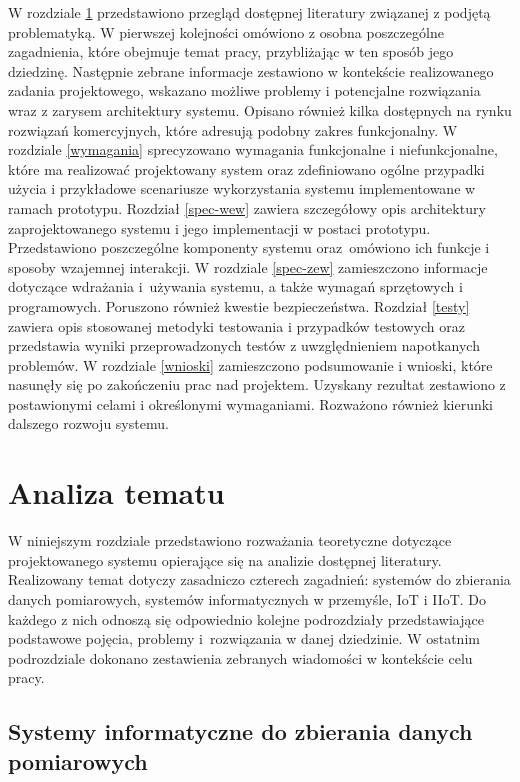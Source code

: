 \documentclass[a4paper, 12pt, twoside]{article}
\begin{document}
W rozdziale \ref{analiza} przedstawiono przegląd dostępnej literatury związanej z podjętą problematyką.
W pierwszej kolejności omówiono z osobna poszczególne zagadnienia, które
obejmuje temat pracy, przybliżając w ten sposób jego dziedzinę.
Następnie zebrane informacje zestawiono w kontekście realizowanego zadania projektowego,
wskazano możliwe problemy i potencjalne rozwiązania wraz z zarysem architektury
systemu. Opisano również kilka dostępnych na rynku rozwiązań komercyjnych,
które adresują podobny zakres funkcjonalny. W rozdziale \ref{wymagania} sprecyzowano
wymagania funkcjonalne i niefunkcjonalne, które ma realizować projektowany system
oraz zdefiniowano ogólne przypadki użycia i przykładowe scenariusze wykorzystania systemu
implementowane w ramach prototypu. Rozdział \ref{spec-wew} zawiera
szczegółowy opis architektury zaprojektowanego systemu i jego implementacji
w postaci prototypu. Przedstawiono poszczególne
komponenty systemu oraz~omówiono ich funkcje i sposoby wzajemnej interakcji.
W rozdziale \ref{spec-zew} zamieszczono informacje dotyczące
wdrażania i~używania systemu, a także wymagań sprzętowych i programowych.
Poruszono również kwestie bezpieczeństwa. Rozdział \ref{testy} zawiera
opis stosowanej metodyki testowania i przypadków testowych oraz przedstawia wyniki przeprowadzonych
testów z uwzględnieniem napotkanych problemów. W rozdziale \ref{wnioski} zamieszczono
podsumowanie i wnioski, które nasunęły się po zakończeniu prac nad projektem.
Uzyskany rezultat zestawiono z postawionymi celami i określonymi wymaganiami.
Rozważono również kierunki dalszego rozwoju systemu.

\newpage
\section{Analiza tematu}\label{analiza}

W niniejszym rozdziale przedstawiono rozważania teoretyczne dotyczące projektowanego
systemu opierające się na analizie dostępnej literatury. Realizowany temat
dotyczy zasadniczo czterech zagadnień: systemów do zbierania danych pomiarowych,
systemów informatycznych w przemyśle, IoT i IIoT.  Do każdego z nich odnoszą się
odpowiednio kolejne podrozdziały przedstawiające podstawowe pojęcia, problemy i~rozwiązania
w danej dziedzinie.
W ostatnim podrozdziale dokonano zestawienia zebranych wiadomości w kontekście
celu pracy.

\subsection{Systemy informatyczne do zbierania danych pomiarowych} \label{system-do-zbierania-danych}
\end{document}
